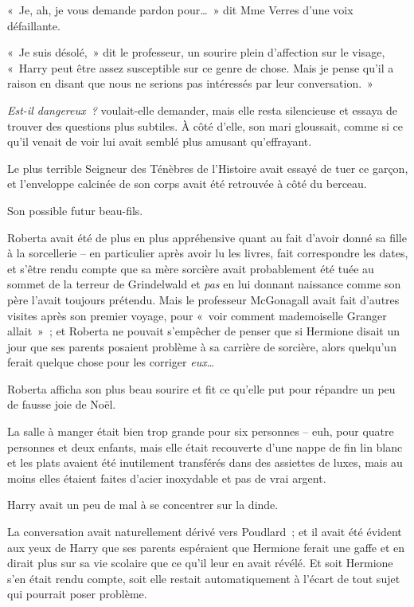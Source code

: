«~Je, ah, je vous demande pardon pour…~» dit Mme Verres d'une voix défaillante.

«~Je suis désolé,~» dit le professeur, un sourire plein d'affection sur le visage, «~Harry peut être assez susceptible sur ce genre de chose. Mais je pense qu'il a raison en disant que nous ne serions pas intéressés par leur conversation.~»

\emph{Est-il dangereux~?} voulait-elle demander, mais elle resta silencieuse et essaya de trouver des questions plus subtiles. À côté d'elle, son mari gloussait, comme si ce qu'il venait de voir lui avait semblé plus amusant qu'effrayant.

Le plus terrible Seigneur des Ténèbres de l'Histoire avait essayé de tuer ce garçon, et l'enveloppe calcinée de son corps avait été retrouvée à côté du berceau.

Son possible futur beau-fils.

Roberta avait été de plus en plus appréhensive quant au fait d'avoir donné sa fille à la sorcellerie -- en particulier après avoir lu les livres, fait correspondre les dates, et s'être rendu compte que sa mère sorcière avait probablement été tuée au sommet de la terreur de Grindelwald et \emph{pas} en lui donnant naissance comme son père l'avait toujours prétendu. Mais le professeur McGonagall avait fait d'autres visites après son premier voyage, pour «~voir comment mademoiselle Granger allait~»~; et Roberta ne pouvait s'empêcher de penser que si Hermione disait un jour que ses parents posaient problème à sa carrière de sorcière, alors quelqu'un ferait quelque chose pour les corriger \emph{eux}…

Roberta afficha son plus beau sourire et fit ce qu'elle put pour répandre un peu de fausse joie de Noël.

\later

La salle à manger était bien trop grande pour six personnes -- euh, pour quatre personnes et deux enfants, mais elle était recouverte d'une nappe de fin lin blanc et les plats avaient été inutilement transférés dans des assiettes de luxes, mais au moins elles étaient faites d'acier inoxydable et pas de vrai argent.

Harry avait un peu de mal à se concentrer sur la dinde.

La conversation avait naturellement dérivé vers Poudlard~; et il avait été évident aux yeux de Harry que ses parents espéraient que Hermione ferait une gaffe et en dirait plus sur sa vie scolaire que ce qu'il leur en avait révélé. Et soit Hermione s'en était rendu compte, soit elle restait automatiquement à l'écart de tout sujet qui pourrait poser problème.

